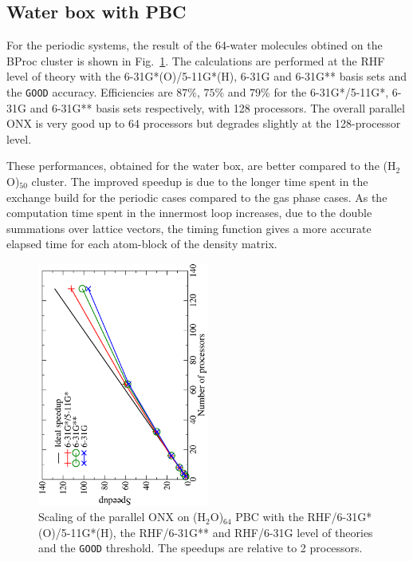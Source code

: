 \documentclass[prl,twocolumn,twocolumngrid,superbib]{revtex4}
\begin{document}
\subsection{Water box with PBC}
 For the periodic systems, the result of the 64-water molecules obtined on the BProc cluster is shown
 in Fig.~\ref{fig:h2o_pbc_64}. The calculations are performed at the
 RHF level of theory with the 6-31G*(O)/5-11G*(H), 6-31G and 6-31G** basis sets and the {\tt GOOD} accuracy. 
 Efficiencies are $87\%$, $75\%$ and $79\%$ for the 6-31G*/5-11G*, 6-31G and 6-31G** 
 basis sets respectively, with 128 processors. The overall parallel ONX is very
 good up to 64 processors but degrades slightly at the 128-processor level.

 These performances, obtained for the water box, are better compared to the (H$_2$O)$_{50}$ cluster. The 
 improved speedup is due to the longer time spent in the
 exchange build for the periodic cases compared 
 to the gas phase cases. As the computation time spent in the innermost loop 
 increases, due to the double summations over lattice vectors,
 the timing function gives a more accurate elapsed time for each 
 atom-block of the density matrix.\\

\begin{figure}[p]
  \caption{\protect
    Scaling of the parallel ONX on (H$_2$O)$_{64}$ PBC with the RHF/6-31G*(O)/5-11G*(H),
    the RHF/6-31G** and RHF/6-31G level of theories and the {\tt GOOD} threshold. 
    The speedups are relative to 2 processors.
  }\label{fig:h2o_pbc_64}
  \includegraphics[angle=-90,width=0.5\textwidth]{h2o_pbc_64}
\end{figure}
\end{document}
